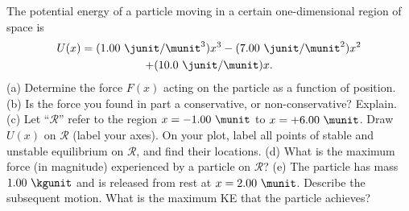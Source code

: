 The potential energy of a particle moving
in a certain one-dimensional region of space is
\begin{multline*}
  U(x) = (1.00\ \junit/\munit^3) x^3 - (7.00\ \junit/\munit^2) x^2 \\ + (10.0\ \junit/\munit) x.
\end{multline*}
%
(a) Determine the force $F(x)$ acting on the particle as a function of
position.\hwendpart
%
(b) Is the force you found in part a conservative, or non-conservative?
Explain.\hwendpart
%
(c) Let ``$\mathcal{R}$'' refer to the region $x = -1.00\ \munit$
to $x= + 6.00\ \munit$.
Draw $U(x)$ on $\mathcal{R}$ (label your axes). On your plot,
label all points of stable and unstable equilibrium on $\mathcal{R}$,
and find their locations.\hwendpart
%
(d) What is the maximum force (in magnitude) experienced by a
particle on $\mathcal{R}$?\hwendpart
%
(e) The particle has mass $1.00\ \kgunit$ and is released from rest at
$x=2.00\ \munit$. Describe the subsequent motion. What is the maximum
KE that the particle achieves?
